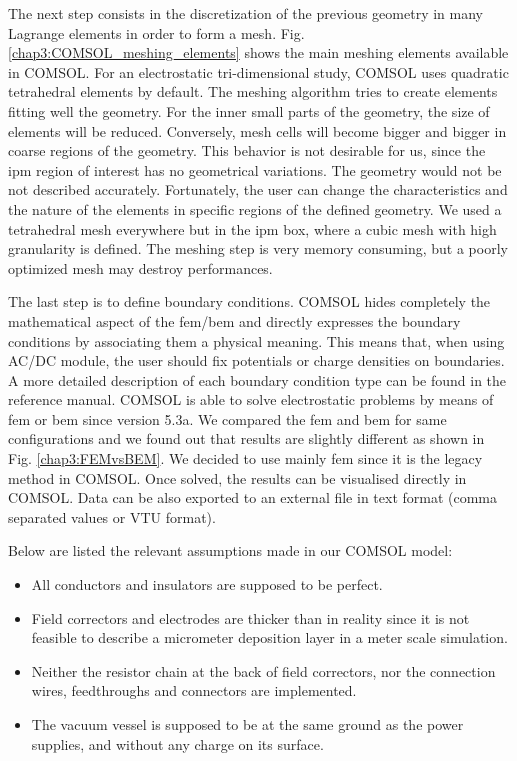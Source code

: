 \begin{refsection}
  The next step consists in the discretization of the previous geometry in many Lagrange elements in order to form a mesh. Fig. \ref{chap3:COMSOL_meshing_elements} shows the main meshing elements available in COMSOL. For an electrostatic tri-dimensional study, COMSOL uses quadratic tetrahedral elements by default. The meshing algorithm tries to create elements fitting well the geometry. For the inner small parts of the geometry, the size of elements will be reduced. Conversely, mesh cells will become bigger and bigger in coarse regions of the geometry. This behavior is not desirable for us, since the \acrshort{ipm} region of interest has no geometrical variations. The geometry would not be not described accurately. Fortunately, the user can change the characteristics and the nature of the elements in specific regions of the defined geometry. We used a tetrahedral mesh everywhere but in the \acrshort{ipm} box, where a cubic mesh with high granularity is defined. The meshing step is very memory consuming, but a poorly optimized mesh may destroy performances.
  

  The last step is to define boundary conditions. COMSOL hides completely the mathematical aspect of the \acrshort{fem}/\acrshort{bem} and directly expresses the boundary conditions by associating them a physical meaning. This means that, when using AC/DC module, the user should fix potentials or charge densities on boundaries. A more detailed description of each boundary condition type can be found in the reference manual. COMSOL is able to solve electrostatic problems by means of \acrshort{fem} or \acrshort{bem} since version 5.3a. We compared the \acrshort{fem} and \acrshort{bem} for same configurations and we found out that results are slightly different as shown in Fig. \ref{chap3:FEMvsBEM}. We decided to use mainly \acrshort{fem} since it is the legacy method in COMSOL.
  Once solved, the results can be visualised directly in COMSOL. Data can be also exported to an external file in text format (comma separated values or VTU format).

  Below are listed the relevant assumptions made in our COMSOL model:
  \begin{itemize}
    \item All conductors and insulators are supposed to be perfect.
    \item Field correctors and electrodes are thicker than in reality since it is not feasible to describe a micrometer deposition layer in a meter scale simulation.
    \item Neither the resistor chain at the back of field correctors, nor the connection wires, feedthroughs and connectors are implemented.
    \item The vacuum vessel is supposed to be at the same ground as the power supplies, and without any charge on its surface.
  \end{itemize}


\end{refsection}
